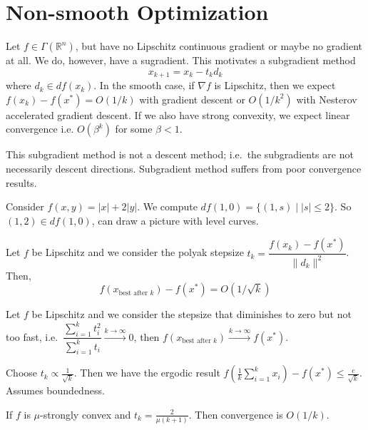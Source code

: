 \documentclass[english, 11pt]{article}
\begin{document}
\section{Non-smooth Optimization}
Let $f \in \Gamma(\mathbb{R}^n)$, but have no Lipschitz continuous gradient or maybe no gradient at all. We do, however, have a sugradient. This motivates a subgradient method
\[
x_{k+1} = x_k - t_k d_k
\]  
where $d_k \in d f(x_k)$. In the smooth case, if $\nabla f$ is Lipschitz, then we expect $f(x_k) - f(x^*) = O(1/k)$ with gradient descent or $O(1/k^2)$ with Nesterov accelerated gradient descent. If we also have strong convexity, we expect linear convergence i.e. $O(\beta^k)$ for some $\beta<1$.

\begin{rem}
This subgradient method is not a  descent method; i.e.\ the subgradients are not necessarily descent directions. Subgradient method suffers from poor convergence results. 

\end{rem}

\begin{exmp}
Consider $f(x,y) = |x|  + 2 |y|$. We compute $df(1,0) = \{ (1,s) \mid |s| \le 2 \}$. So $(1,2) \in df(1,0)$, can draw a picture with level curves.
\end{exmp}

\begin{thrm}[8.13 in Beck]
Let $f$ be Lipschitz and we consider the polyak stepsize $t_k = \dfrac{ f(x_k) - f(x^*)}{\|d_k\|^2}$. Then,
\[
f(x_{\text{best after } k} ) - f(x^*) = O(1/\sqrt{k})
\]
\end{thrm}

\begin{thrm}[8.25 in Beck]
Let $f$ be Lipschitz and we consider the stepsize that diminishes to zero but not too fast, i.e.\ $\dfrac{ \sum_{i=1}^k t_i^2}{\sum_{i=1}^k t_i} \xrightarrow{k \to \infty} 0$, then $f(x_{\text{best after } k} ) \xrightarrow{k \to \infty} f(x^*)$.
\end{thrm}

\begin{thrm}[Bubeck]
Choose $t_k \propto \frac{1}{\sqrt{k}}$. Then we have the ergodic result $f \left( \frac{1}{k} \sum_{i=1}^k x_i \right) - f(x^*) \le \frac{c}{\sqrt{k}}$. Assumes boundedness.
\end{thrm}

\begin{thrm}[8.31 in Beck]
If $f$ is $\mu$-strongly convex and $t_k = \frac{2}{\mu(k+1)}$. Then convergence is $O(1/k)$.
\end{thrm}
\end{document}
